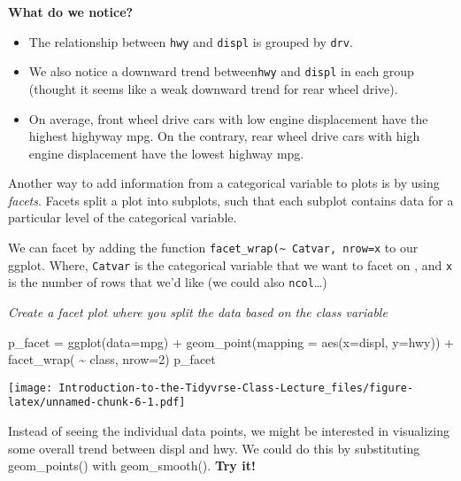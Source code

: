 \documentclass[
]{article}
\newenvironment{Shaded}{\begin{snugshade}}{\end{snugshade}}
\newcommand{\AttributeTok}[1]{\textcolor[rgb]{0.77,0.63,0.00}{#1}}
\newcommand{\DecValTok}[1]{\textcolor[rgb]{0.00,0.00,0.81}{#1}}
\newcommand{\FunctionTok}[1]{\textcolor[rgb]{0.00,0.00,0.00}{#1}}
\newcommand{\NormalTok}[1]{#1}
\newcommand{\OtherTok}[1]{\textcolor[rgb]{0.56,0.35,0.01}{#1}}
\newcommand{\SpecialCharTok}[1]{\textcolor[rgb]{0.00,0.00,0.00}{#1}}
\begin{document}
\textbf{What do we notice?}

\begin{itemize}
\item
  The relationship between \texttt{hwy} and \texttt{displ} is grouped by
  \texttt{drv}.
\item
  We also notice a downward trend between\texttt{hwy} and \texttt{displ}
  in each group (thought it seems like a weak downward trend for rear
  wheel drive).
\item
  On average, front wheel drive cars with low engine displacement have
  the highest highyway mpg. On the contrary, rear wheel drive cars with
  high engine displacement have the lowest highway mpg.
\end{itemize}

Another way to add information from a categorical variable to plots is
by using \emph{facets}. Facets split a plot into subplots, such that
each subplot contains data for a particular level of the categorical
variable.

We can facet by adding the function
\texttt{facet\_wrap(\textasciitilde{}\ Catvar,\ nrow=x} to our ggplot.
Where, \texttt{Catvar} is the categorical variable that we want to facet
on , and \texttt{x} is the number of rows that we'd like (we could also
\texttt{ncol}\ldots)

\emph{Create a facet plot where you split the data based on the class
variable}

\begin{Shaded}
\begin{Highlighting}[]
\NormalTok{p\_facet }\OtherTok{=} \FunctionTok{ggplot}\NormalTok{(}\AttributeTok{data=}\NormalTok{mpg) }\SpecialCharTok{+} 
  \FunctionTok{geom\_point}\NormalTok{(}\AttributeTok{mapping =} \FunctionTok{aes}\NormalTok{(}\AttributeTok{x=}\NormalTok{displ, }\AttributeTok{y=}\NormalTok{hwy)) }\SpecialCharTok{+}
  \FunctionTok{facet\_wrap}\NormalTok{( }\SpecialCharTok{\textasciitilde{}}\NormalTok{ class, }\AttributeTok{nrow=}\DecValTok{2}\NormalTok{)}
\NormalTok{p\_facet}
\end{Highlighting}
\end{Shaded}

\texttt{[image: Introduction-to-the-Tidyvrse-Class-Lecture\_files/figure-latex/unnamed-chunk-6-1.pdf]}

Instead of seeing the individual data points, we might be interested in
visualizing some overall trend between displ and hwy. We could do this
by substituting geom\_points() with geom\_smooth(). \textbf{Try it!}
\end{document}
